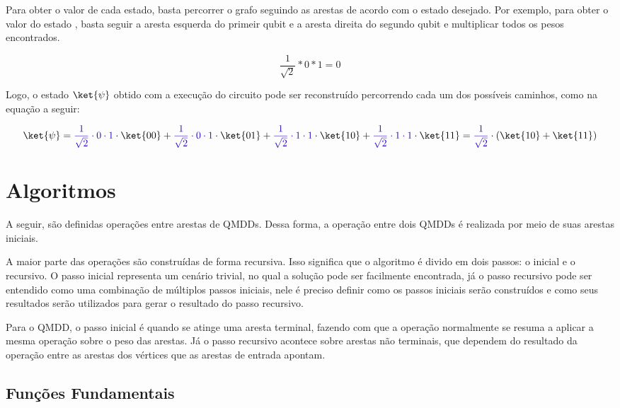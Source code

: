 Para obter o valor de cada estado, basta percorrer o grafo seguindo as arestas de acordo com o estado desejado. Por exemplo, para obter o valor do estado , basta seguir a aresta esquerda do primeir qubit e a aresta direita do segundo qubit e multiplicar todos os pesos encontrados.

\begin{equation}
  \frac{1}{\sqrt{2}} * 0 * 1 = 0
\end{equation}

Logo, o estado $\ket{\psi}$ obtido com a execução do circuito pode ser reconstruído percorrendo cada um dos possíveis caminhos, como na equação a seguir:

\begin{equation}
  \ket{\psi}
  =
  \textcolor{blue}{\frac{1}{\sqrt{2}} \cdot 0 \cdot 1} \cdot \ket{00}
  +
  \textcolor{blue}{\frac{1}{\sqrt{2}} \cdot 0 \cdot 1} \cdot \ket{01}
  +
  \textcolor{blue}{\frac{1}{\sqrt{2}} \cdot 1 \cdot 1} \cdot \ket{10}
  +
  \textcolor{blue}{\frac{1}{\sqrt{2}} \cdot 1 \cdot 1} \cdot \ket{11}
  =
  \textcolor{blue}{\frac{1}{\sqrt{2}}} \cdot (\ket{10} + \ket{11})
\end{equation}

\section{Algoritmos}\label{sec:qmdd_algorithms}

A seguir, são definidas operações entre arestas de QMDDs. Dessa forma, a operação entre dois QMDDs é realizada por meio de suas arestas iniciais.

A maior parte das operações são construídas de forma recursiva. Isso significa que o algoritmo é divido em dois passos: o inicial e o recursivo. O passo inicial representa um cenário trivial, no qual a solução pode ser facilmente encontrada, já o passo recursivo pode ser entendido como uma combinação de múltiplos passos iniciais, nele é preciso definir como os passos iniciais serão construídos e como seus resultados serão utilizados para gerar o resultado do passo recursivo.

Para o QMDD, o passo inicial é quando se atinge uma aresta terminal, fazendo com que a operação normalmente se resuma a aplicar a mesma operação sobre o peso das arestas. Já o passo recursivo acontece sobre arestas não terminais, que dependem do resultado da operação entre as arestas dos vértices que as arestas de entrada apontam. 

\subsection{Funções Fundamentais}\label{sub:fundamentals}

